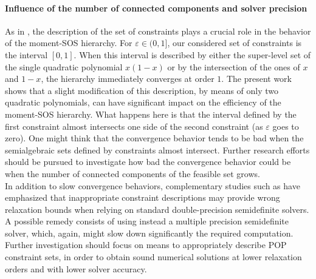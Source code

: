 \documentclass[a4paper,12pt]{article}
\begin{document}
\paragraph{{Influence of the number of connected components and solver precision}}
As in {\cite{st96}}, the description of the set of constraints plays a crucial role in the behavior of the moment-SOS hierarchy. 
For $\varepsilon \in (0, 1]$, our considered set of constraints is the interval $[0, 1]$. 
When this interval is described by either the super-level set of the single quadratic polynomial $x(1-x)$ or by the intersection of the ones of $x$ and $1 -x$, the hierarchy immediately converges at order $1$. 
The present work shows that a slight modification of this description, by means of only two quadratic polynomials, can have significant impact on the efficiency of the moment-SOS hierarchy. 
{
What happens here is that the interval defined by the first constraint almost intersects one side of the second constraint (as $\varepsilon$ goes to zero). 
One might think that the convergence behavior tends to be bad when the semialgebraic sets defined by constraints almost intersect. 
Further research efforts should be pursued to investigate how bad the convergence behavior could be when the number of connected components of the feasible set grows.}\\
%
In addition to slow convergence behaviors, complementary studies such as \cite{wa12} have emphasized that inappropriate constraint descriptions may provide wrong relaxation bounds when relying on  standard double-precision semidefinite solvers. 
A possible remedy consists of using instead a multiple precision semidefinite solver, which, again, might slow down significantly the required computation. \\
%
Further investigation should focus on means to  appropriately describe POP constraint sets, in order to obtain sound numerical solutions at lower relaxation orders and with lower solver accuracy. 
\end{document}
